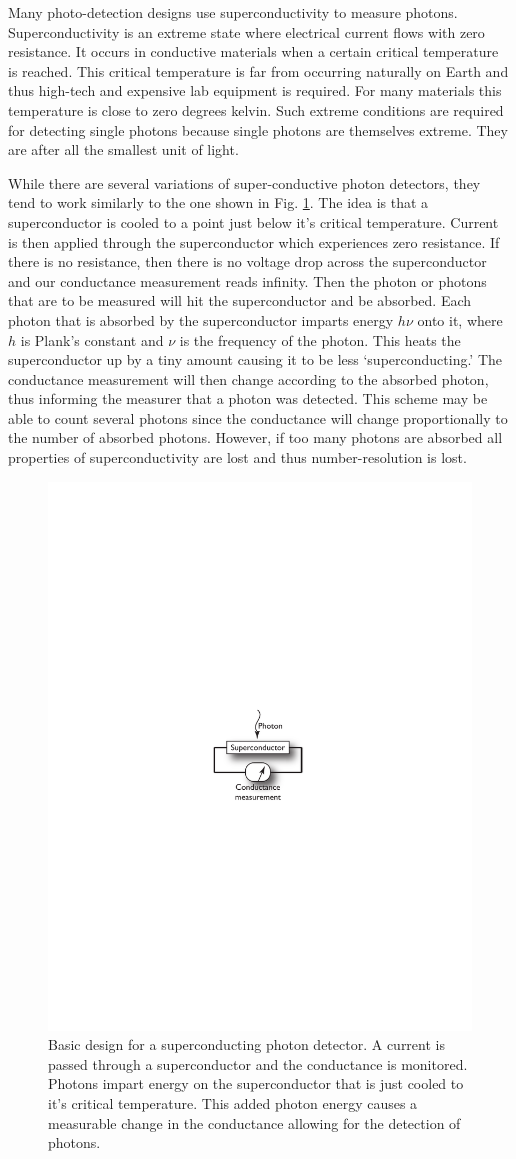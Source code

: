 \documentclass[aps,pra,twocolumn,amsmath,amssymb,nofootinbib,superscriptaddress]{revtex4}
\begin{document}
Many photo-detection designs use superconductivity to measure photons. Superconductivity is an extreme state where electrical current flows with zero resistance. It occurs in conductive materials when a certain critical temperature is reached. This critical temperature is far from occurring naturally on Earth and thus high-tech and expensive lab equipment is required. For many materials this temperature is close to zero degrees kelvin. Such extreme conditions are required for detecting single photons because single photons are themselves extreme. They are after all the smallest unit of light.

While there are several variations of super-conductive photon detectors, they tend to work similarly to the one shown in Fig. \ref{fig:superconducting_detector}. The idea is that a superconductor is cooled to a point just below it's critical temperature. Current is then applied through the superconductor which experiences zero resistance. If there is no resistance, then there is no voltage drop across the superconductor and our conductance measurement reads infinity. Then the photon or photons that are to be measured will hit the superconductor and be absorbed. Each photon that is absorbed by the superconductor imparts energy $h\nu$ onto it, where $h$ is Plank's constant and $\nu$ is the frequency of the photon. This heats the superconductor up by a tiny amount causing it to be less `superconducting.' The conductance measurement will then change according to the absorbed photon, thus informing the measurer that a photon was detected. This scheme may be able to count several photons since the conductance will change proportionally to the number of absorbed photons. However, if too many photons are absorbed all properties of superconductivity are lost and thus number-resolution is lost.

\begin{figure}[!htb]
\includegraphics[width=0.3\columnwidth]{superconducting_detector}
\caption{Basic design for a superconducting photon detector. A current is passed through a superconductor and the conductance is monitored. Photons impart energy on the superconductor that is just cooled to it's critical temperature. This added photon energy causes a measurable change in the conductance allowing for the detection of photons.}
\label{fig:superconducting_detector}
\end{figure}
\end{document}
